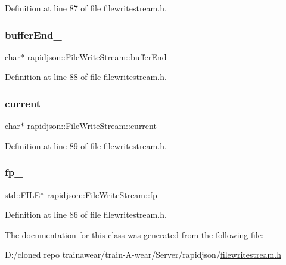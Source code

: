 Definition at line 87 of file filewritestream.\+h.

\mbox{\label{classrapidjson_1_1_file_write_stream_afc6c60e519e8b58ec7fd9930aa8e41eb}} 
\subsubsection{\texorpdfstring{bufferEnd\_}{bufferEnd\_}}
{\footnotesize\ttfamily char$\ast$ rapidjson\+::\+File\+Write\+Stream\+::buffer\+End\+\_\+\hspace{0.3cm}{\ttfamily [private]}}



Definition at line 88 of file filewritestream.\+h.

\mbox{\label{classrapidjson_1_1_file_write_stream_a250f94025fad330db98c97da9d3967a6}} 
\subsubsection{\texorpdfstring{current\_}{current\_}}
{\footnotesize\ttfamily char$\ast$ rapidjson\+::\+File\+Write\+Stream\+::current\+\_\+\hspace{0.3cm}{\ttfamily [private]}}



Definition at line 89 of file filewritestream.\+h.

\mbox{\label{classrapidjson_1_1_file_write_stream_a2feb4173ac3aa7a32c7e01bd42e3ffeb}} 
\subsubsection{\texorpdfstring{fp\_}{fp\_}}
{\footnotesize\ttfamily std\+::\+F\+I\+LE$\ast$ rapidjson\+::\+File\+Write\+Stream\+::fp\+\_\+\hspace{0.3cm}{\ttfamily [private]}}



Definition at line 86 of file filewritestream.\+h.



The documentation for this class was generated from the following file\+:\begin{DoxyCompactItemize}
\item 
D\+:/cloned repo trainawear/train-\/\+A-\/wear/\+Server/rapidjson/\mbox{\hyperlink{filewritestream_8h}{filewritestream.\+h}}\end{DoxyCompactItemize}
